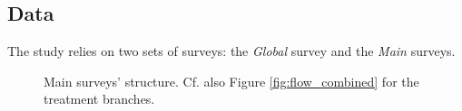 \subsection{Data}\label{subsec:data}



The study relies on two sets of surveys: the \textit{Global} survey and the \textit{Main} surveys. %

\begin{figure}[h!]
  \caption[Main surveys' structure]{Main surveys' structure. Cf. also Figure \ref{fig:flow_combined} for the treatment branches.}\label{fig:flow_simple}
\end{figure}

